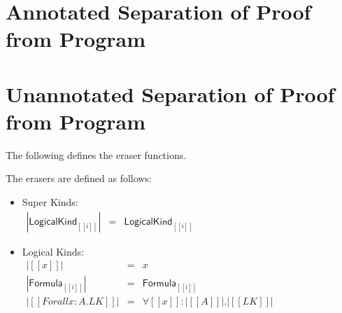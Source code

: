 \documentclass[phd,appendix,dedicationpage,ackpage,epigraphpage]{uithesis}
\begin{document}
\newpage
\section{Annotated Separation of Proof from Program}
\label{sec:annotated_separation_of_proof_from_program}
\Sepall{}

\newpage
\section{Unannotated Separation of Proof from Program}
\label{sec:unannotated_separation_of_proof_from_program}
\SepUall{}

\noindent
The following defines the eraser functions.
\begin{definition}
  \label{def:eraser_function}
  The erasers are defined as follows:
  \begin{itemize}
  \item Super Kinds:\\
    \begin{math}
      \begin{array}{lll}
        |\mathsf{LogicalKind}_{[[i]]}| & = & \mathsf{LogicalKind}_{[[i]]}
      \end{array}
    \end{math}
  \item Logical Kinds:\\
    \begin{math}
      \begin{array}{lll}
        |[[x]]|                   & = & x\\
        |\mathsf{Formula}_{[[i]]}| & = & \mathsf{Formula}_{{[[i]]}}\\
        |[[Forall x : A . LK]]|   & = & \forall [[x]] : |[[A]]|.|[[LK]]|
      \end{array}
    \end{math}
    

\end{itemize}
\end{definition}
\end{document}
